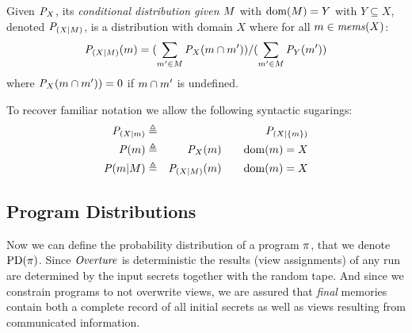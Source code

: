 \begin{definition}
  Given ${\mathit{P}}_{X}$, its \emph{conditional distribution given
  $M$} with $\mathrm{dom}(M) = Y$ with $Y \subseteq X$, denoted
  $\mathit{P}_{({X}|{M})}$, is a distribution with domain $X$ where for all
  $m \in \mathit{mems}(X)$:
  $$
  \mathit{P}_{({X}|{M})}(m) =
  (\sum_{m' \in M} {\mathit{P}}_{X}(m \cap m')) /
  (\sum_{m' \in M} {\mathit{P}}_{Y}(m'))
  $$
  where ${\mathit{P}}_{X}(m \cap m')) = 0$ if $m \cap m'$ is undefined.
\end{definition}
To recover familiar notation we allow the following syntactic
sugarings:
\begin{eqnarray*}
  \mathit{P}_{({X}|{m})}  &\triangleq& \mathit{P}_{({X}|{\{ m\}})}\\
  \mathit{P}(m)  &\triangleq& {\mathit{P}}_{X}(m)  \qquad \mathrm{dom}(m) = X\\
  \mathit{P}(m|M)  &\triangleq& \mathit{P}_{({X}|{M})}(m) \qquad \mathrm{dom}(m) = X
\end{eqnarray*}

\subsection{Program Distributions}
Now we can define the probability distribution of a program $\pi$,
that we denote $\mathrm{PD}(\pi)$. Since $\mathit{Overture}$ is deterministic the
results (view assignments) of any run are determined by the input
secrets together with the random tape. And since we constrain programs
to not overwrite views, we are assured that \emph{final} memories
contain both a complete record of all initial secrets as well as views
resulting from communicated information.

